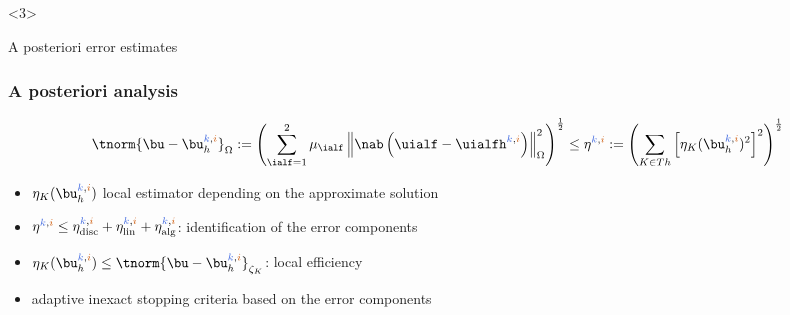 \documentclass[aspectratio=169]{beamer}
\newcommand{\kk}{\textcolor{royalblue}{k}}
\newcommand{\ii}{\textcolor{burntorange}{i}}
\begin{document}
\begin{frame}
\begin{onlyenv}<3>
\begin{center}
\Huge{\textcolor{carmine}{A posteriori error estimates}}
\end{center}
\end{onlyenv}
\end{frame}
%
\begin{frame}
\frametitle{A posteriori analysis}
\begin{equation*}
\tnorm{\bu-\bu_h^{\kk,\ii}}_{\Omega} \egaldef \left(\sum_{\ialf = 1}^2 \mu_\ialf \left\|\nab \left(\uialf-\uialfh^{\kk,\ii} \right)\right\|_{\Omega}^2 \right)^{\frac{1}{2}} \leq \eta^{\kk,\ii} \egaldef \left(\sum_{K \in Th}\left[\eta_{K}(\bu_h^{\kk,\ii})^{2} \right]^2\right)^{\frac{1}{2}}
\end{equation*}
\begin{itemize}
\item $\eta_{K}(\bu_h^{\kk,\ii})$ local estimator depending on the approximate solution 
\item $\eta^{\kk,\ii} \leq \eta_{\mathrm{disc}}^{\kk,\ii} + \eta_{\mathrm{lin}}^{\kk,\ii} + \eta_{\mathrm{alg}}^{\kk,\ii}$: identification of the error components
\item $\eta_{K}(\bu_h^{\kk,\ii}) \leq \tnorm{\bu-\bu_h^{\kk,\ii}}_{\zeta_K}$: local efficiency
\item adaptive inexact stopping criteria based on the error components
\end{itemize} 
\end{frame}
%
\end{document}
